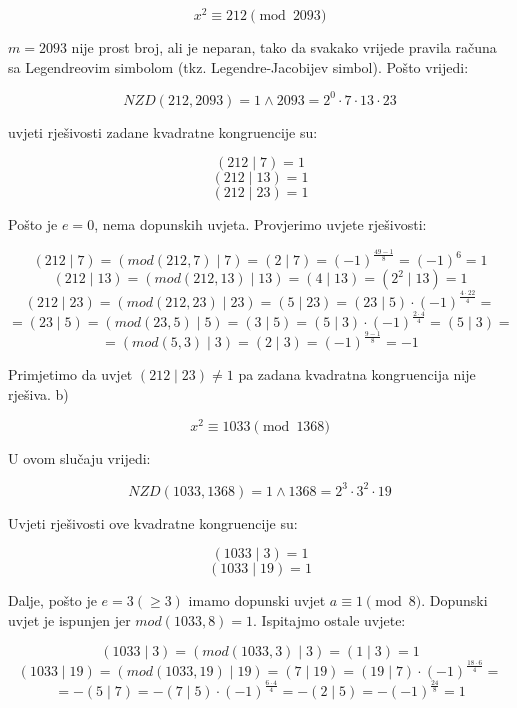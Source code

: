 \documentclass[12pt]{article}
\begin{document}
$$x^2 \equiv 212 \pmod{2093}$$\vspace{1mm}

$m = 2093$ nije prost broj, ali je neparan, tako da svakako vrijede pravila računa sa Legendreovim simbolom (tkz. Legendre-Jacobijev simbol). Pošto vrijedi:

$$NZD(212, 2093) = 1 \land 2093 = 2^0 \cdot 7 \cdot 13 \cdot 23$$ \vspace{1mm}

uvjeti rješivosti zadane kvadratne kongruencije su:

$$(212 \mid 7) = 1$$
$$(212 \mid 13) = 1$$
$$(212 \mid 23) = 1$$\vspace{1mm}

Pošto je $e = 0$, nema dopunskih uvjeta. Provjerimo uvjete rješivosti:

$$(212 \mid 7) = (mod(212, 7) \mid 7) = (2 \mid 7) = (-1)^{\frac{49-1}{8}} = (-1)^6 = 1$$
$$(212 \mid 13) = (mod(212, 13) \mid 13) = (4 \mid 13) = (2^2 \mid 13) = 1$$\vspace{1mm}
$$(212 \mid 23) = (mod(212, 23) \mid 23) = (5 \mid 23) = (23 \mid 5) \cdot (-1)^{\frac{4\cdot 22}{4}} =$$ 
$$= (23 \mid 5) = (mod(23, 5) \mid 5) = (3 \mid 5) = (5 \mid 3) \cdot (-1)^{\frac{2\cdot 4}{4}} = (5 \mid 3) =$$ 
$$= (mod(5, 3) \mid 3) = (2 \mid 3) = (-1)^{\frac{9-1}{8}} = -1$$\vspace{1mm}

Primjetimo da uvjet $(212 \mid 23) \neq 1$ pa zadana kvadratna kongruencija nije rješiva.\vspace{1mm}
\newpage
b)

$$x^2 \equiv 1033 \pmod{1368}$$\vspace{1mm}

U ovom slučaju vrijedi:

$$NZD(1033, 1368) = 1 \land 1368 = 2^3 \cdot 3^2 \cdot 19$$\vspace{1mm}

Uvjeti rješivosti ove kvadratne kongruencije su:

$$(1033 \mid 3) = 1$$
$$(1033 \mid 19) = 1$$\vspace{1mm}

Dalje, pošto je $e = 3 (\geq 3)$ imamo dopunski uvjet $a \equiv 1 \pmod{8}$. Dopunski uvjet je ispunjen jer $mod(1033, 8) = 1$. Ispitajmo ostale uvjete:

$$(1033 \mid 3) = (mod(1033, 3) \mid 3) = (1 \mid 3) = 1$$\vspace{1mm}
$$(1033 \mid 19) = (mod(1033, 19) \mid 19) = (7 \mid 19) = (19 \mid 7) \cdot (-1)^{\frac{18\cdot 6}{4}} =$$
$$= - (5 \mid 7) = - (7 \mid 5) \cdot (-1)^{\frac{6\cdot 4}{4}} = - (2 \mid 5) = - (-1)^{\frac{24}{8}} = 1$$\vspace{1mm}
\end{document}
